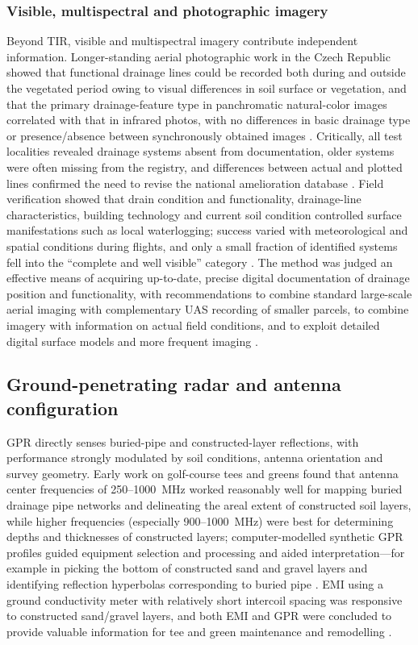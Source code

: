 \subsubsection{Visible, multispectral and photographic imagery}

Beyond TIR, visible and multispectral imagery contribute independent information. Longer-standing aerial photographic work in the Czech Republic showed that functional drainage lines could be recorded both during and outside the vegetated period owing to visual differences in soil surface or vegetation, and that the primary drainage-feature type in panchromatic natural-color images correlated with that in infrared photos, with no differences in basic drainage type or presence/absence between synchronously obtained images \parencite{Tlapáková2017}. Critically, all test localities revealed drainage systems absent from documentation, older systems were often missing from the registry, and differences between actual and plotted lines confirmed the need to revise the national amelioration database \parencite{Tlapáková2017}. Field verification showed that drain condition and functionality, drainage-line characteristics, building technology and current soil condition controlled surface manifestations such as local waterlogging; success varied with meteorological and spatial conditions during flights, and only a small fraction of identified systems fell into the ``complete and well visible'' category \parencite{Tlapáková2017}. The method was judged an effective means of acquiring up-to-date, precise digital documentation of drainage position and functionality, with recommendations to combine standard large-scale aerial imaging with complementary UAS recording of smaller parcels, to combine imagery with information on actual field conditions, and to exploit detailed digital surface models and more frequent imaging \parencite{Tlapáková2017}.

\subsection{Ground-penetrating radar and antenna configuration}

GPR directly senses buried-pipe and constructed-layer reflections, with performance strongly modulated by soil conditions, antenna orientation and survey geometry. Early work on golf-course tees and greens found that antenna center frequencies of 250--1000~MHz worked reasonably well for mapping buried drainage pipe networks and delineating the areal extent of constructed soil layers, while higher frequencies (especially 900--1000~MHz) were best for determining depths and thicknesses of constructed layers; computer-modelled synthetic GPR profiles guided equipment selection and processing and aided interpretation---for example in picking the bottom of constructed sand and gravel layers and identifying reflection hyperbolas corresponding to buried pipe \parencite{Allred2005}. EMI using a ground conductivity meter with relatively short intercoil spacing was responsive to constructed sand/gravel layers, and both EMI and GPR were concluded to provide valuable information for tee and green maintenance and remodelling \parencite{Allred2005}.

